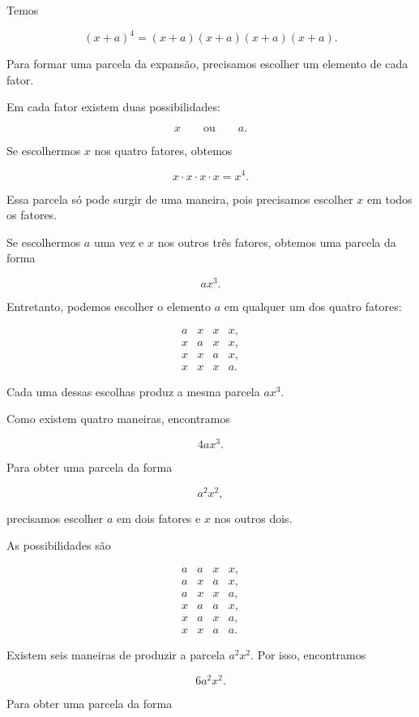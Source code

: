 \documentclass[12pt,a4paper]{article}
\begin{document}
Temos

\[
(x+a)^4=(x+a)(x+a)(x+a)(x+a).
\]

Para formar uma parcela da expansão, precisamos escolher um elemento de
cada fator.

Em cada fator existem duas possibilidades:

\[
x
\qquad\text{ou}\qquad
a.
\]

Se escolhermos \(x\) nos quatro fatores, obtemos

\[
x\cdot x\cdot x\cdot x=x^4.
\]

Essa parcela só pode surgir de uma maneira, pois precisamos escolher
\(x\) em todos os fatores.

Se escolhermos \(a\) uma vez e \(x\) nos outros três fatores, obtemos
uma parcela da forma

\[
ax^3.
\]

Entretanto, podemos escolher o elemento \(a\) em qualquer um dos quatro
fatores:

\[
\begin{array}{cccc}
a & x & x & x,\\
x & a & x & x,\\
x & x & a & x,\\
x & x & x & a.
\end{array}
\]

Cada uma dessas escolhas produz a mesma parcela \(ax^3\).

Como existem quatro maneiras, encontramos

\[
4ax^3.
\]

Para obter uma parcela da forma

\[
a^2x^2,
\]

precisamos escolher \(a\) em dois fatores e \(x\) nos outros dois.

As possibilidades são

\[
\begin{array}{cccc}
a & a & x & x,\\
a & x & a & x,\\
a & x & x & a,\\
x & a & a & x,\\
x & a & x & a,\\
x & x & a & a.
\end{array}
\]

Existem seis maneiras de produzir a parcela \(a^2x^2\). Por isso,
encontramos

\[
6a^2x^2.
\]

Para obter uma parcela da forma
\end{document}
